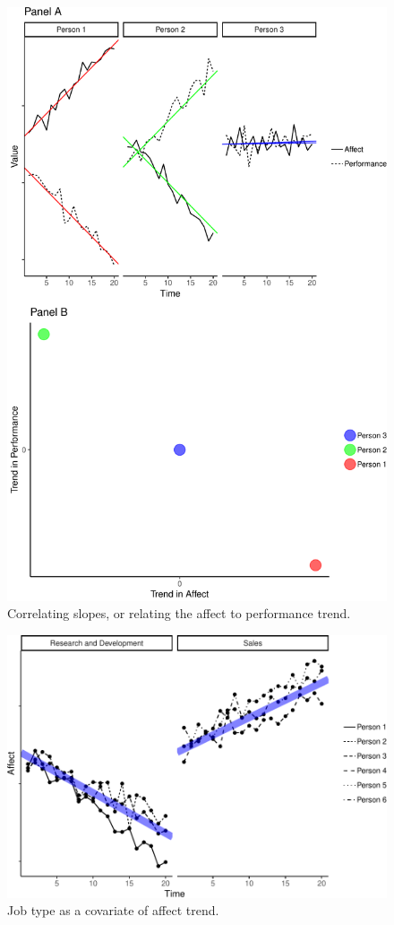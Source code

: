 \documentclass[english,,man]{apa6}
\theoremstyle{definition}
\theoremstyle{definition}
\theoremstyle{definition}
\theoremstyle{remark}
\begin{document}
\begin{figure}
\centering
\includegraphics{figures/unnamed-chunk-14-1.pdf}
\caption{\label{fig:unnamed-chunk-14}Correlating slopes, or relating the
affect to performance trend.\label{trend_correlation}}
\end{figure}

\begin{figure}
\centering
\includegraphics{figures/unnamed-chunk-15-1.pdf}
\caption{\label{fig:unnamed-chunk-15}Job type as a covariate of affect
trend.\label{trend_covariate}}
\end{figure}
\end{document}
